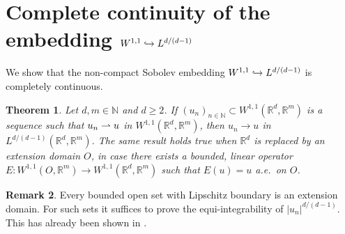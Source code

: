 \documentclass[JEP,XML,SOM,Unicode,published]{cedram}
\def\hto{\mathrel{\lhook\joinrel\to}}
\def\harptod{\mathrel{\relbar\joinrel\rightharpoonup}}
\def\harpto{\mathchoice{\harptod}{\rightharpoonup}{\rightharpoonup}{\rightharpoonup}}
\newtheorem{theorem}{Theorem}[section]
\theoremstyle{definition}
\newtheorem{remark}[theorem]{Remark}
\newcommand{\R}{\mathbb{R}}
\newcommand{\N}{\mathbb{N}}
\begin{document}
\section{Complete continuity of the embedding \texorpdfstring{$W^{1,1}\hto L^{d/(d-1)}$}{}}\label{app:1}
We show that the non-compact Sobolev embedding $W^{1,1}\hto L^{d/(d-1)}$ is completely continuous.
\begin{theorem}\label{thm.embedding}
Let $d,m\in\N$ and $d\geq 2$. If $(u_n)_{n\in\N}\subset W^{1,1}(\R^d,\R^m)$ is a sequence such that $u_n\harpto u$ in $W^{1,1}(\R^d,\R^m)$, then $u_n\to u$ in $L^{d/(d-1)}(\R^d,\R^m)$. The same result holds true when $\R^d$ is replaced by an extension domain $O$, \ie in case there exists a bounded, linear operator $E:W^{1,1}(O,\R^m)\to W^{1,1}(\R^d,\R^m)$ such that $E(u)=u$ a.e.\ on $O$.
\end{theorem}
\begin{remark}
Every bounded open set with Lipschitz boundary is an extension domain. For such sets it suffices to prove the equi-integrability of $|u_n|^{d/(d-1)}$. This has already been shown in \cite[Lem.\,A.3]{DLFS}.
\end{remark}
\end{document}
